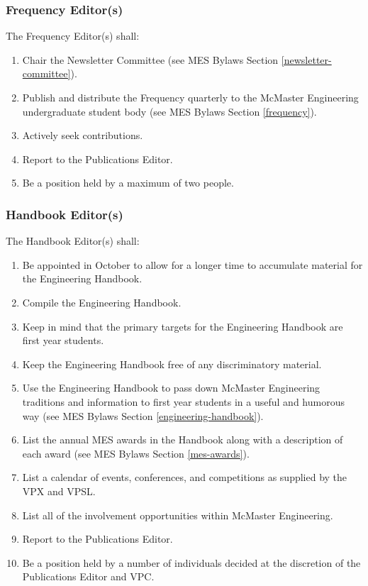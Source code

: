 \subsubsection{Frequency Editor(s)}
\label{frequency-editors}
The Frequency Editor(s) shall:

\begin{enumerate}
 \item
  Chair the Newsletter Committee (see MES Bylaws Section \ref{newsletter-committee}).
 \item
  Publish and distribute the Frequency quarterly to the McMaster Engineering undergraduate student body (see MES Bylaws Section \ref{frequency}).
 \item
  Actively seek contributions.
 \item
  Report to the Publications Editor.
 \item
  Be a position held by a maximum of two people.

\end{enumerate}

\subsubsection{Handbook Editor(s)}
\label{handbook-editors}
The Handbook Editor(s) shall:

\begin{enumerate}
 \item
  Be appointed in October to allow for a longer time to accumulate material for the Engineering Handbook.
 \item
  Compile the Engineering Handbook.
 \item
  Keep in mind that the primary targets for the Engineering Handbook are first year students.
 \item
  Keep the Engineering Handbook free of any discriminatory material.
 \item
  Use the Engineering Handbook to pass down McMaster Engineering traditions and information to first year students in a useful and humorous way (see MES Bylaws Section \ref{engineering-handbook}).
 \item
  List the annual MES awards in the Handbook along with a description of each award (see MES Bylaws Section \ref{mes-awards}).
 \item
  List a calendar of events, conferences, and competitions as supplied by the VPX and VPSL.
 \item
  List all of the involvement opportunities within McMaster Engineering.
 \item
  Report to the Publications Editor.
 \item
  Be a position held by a number of individuals decided at the discretion of the Publications Editor and VPC.

\end{enumerate}

